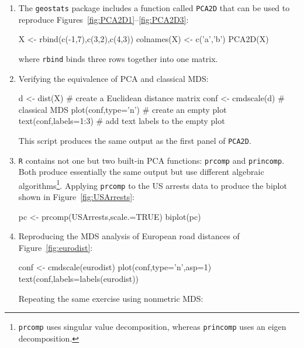 \begin{enumerate}

\item The \texttt{geostats} package includes a function called
  \texttt{PCA2D} that can be used to reproduce
  Figures~\ref{fig:PCA2D1}--\ref{fig:PCA2D3}:

\begin{script}
X <- rbind(c(-1,7),c(3,2),c(4,3))
colnames(X) <- c('a','b')
PCA2D(X)
\end{script}

\noindent where \texttt{rbind} binds three rows together into one
matrix.

\item Verifying the equivalence of PCA and classical MDS:

\begin{script}[firstnumber=3]
d <- dist(X)           # create a Euclidean distance matrix
conf <- cmdscale(d)    # classical MDS
plot(conf,type='n')    # create an empty plot
text(conf,labels=1:3)  # add text labels to the empty plot
\end{script}

This script produces the same output as the first panel of
\texttt{PCA2D}.

\item \texttt{R} contains not one but two built-in PCA functions:
  \texttt{prcomp} and \texttt{princomp}. Both produce essentially the
  same output but use different algebraic
  algorithms\footnote{\texttt{prcomp} uses singular value
  decomposition, whereas \texttt{princomp} uses an eigen
  decomposition.}. Applying \texttt{prcomp} to the US arrests data to
  produce the biplot shown in Figure~\ref{fig:USArrests}:

\begin{script}
pc <- prcomp(USArrests,scale.=TRUE)
biplot(pc)
\end{script}

\item Reproducing the MDS analysis of European road distances of
  Figure~\ref{fig:eurodist}:

\begin{script}
conf <- cmdscale(eurodist)
plot(conf,type='n',asp=1)
text(conf,labels=labels(eurodist))
\end{script}

Repeating the same exercise using nonmetric MDS:



\end{enumerate}
